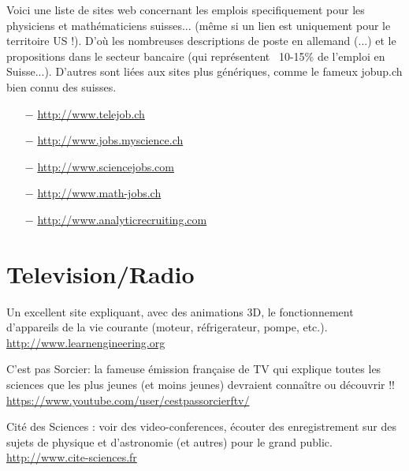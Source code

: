 	{\Large {}} Voici une liste de sites web concernant les emplois specifiquement pour les physiciens et mathématiciens suisses... (même si un lien est uniquement pour le territoire US !). D'où les nombreuses descriptions de poste en allemand (...) et le propositions dans le secteur bancaire (qui représentent ~10-15\% de l'emploi en Suisse...). D'autres sont liées aux sites plus génériques, comme le fameux jobup.ch bien connu des suisses.
	
	\begin{itemize}	 
		\item[$-$] \href{http://www.telejob.ch}{\color{blue}http://www.telejob.ch} 
	
		\item[$-$] \href{http://www.jobs.myscience.ch}{\color{blue}http://www.jobs.myscience.ch} 
	
		\item[$-$] \href{http://www.sciencejobs.com}{\color{blue}http://www.sciencejobs.com}
	
		\item[$-$] \href{http://www.math-jobs.ch}{\color{blue}http://www.math-jobs.ch}
	
		\item[$-$] \href{http://www.analyticrecruiting.com}{\color{blue}http://www.analyticrecruiting.com}
	\end{itemize}
	
	\section{Television/Radio}

	{\Large {}} Un excellent site expliquant, avec des animations 3D,  le fonctionnement d'appareils de la vie courante (moteur, réfrigerateur, pompe, etc.).\\
	\href{http://www.learnengineering.org}{\color{blue}http://www.learnengineering.org}
	
	\bcdfrance{} C'est pas Sorcier: la fameuse émission française de TV qui explique toutes les sciences que les plus jeunes (et moins jeunes) devraient connaître ou découvrir !!\\
	\href{https://www.youtube.com/user/cestpassorcierftv/}{\color{blue}https://www.youtube.com/user/cestpassorcierftv/}
	
	\bcdfrance{} Cité des Sciences : voir des video-conferences, écouter des enregistrement sur des sujets de physique et d'astronomie (et autres) pour le grand public.\\
	\href{http://www.cite-sciences.fr}{\color{blue}http://www.cite-sciences.fr}
	
